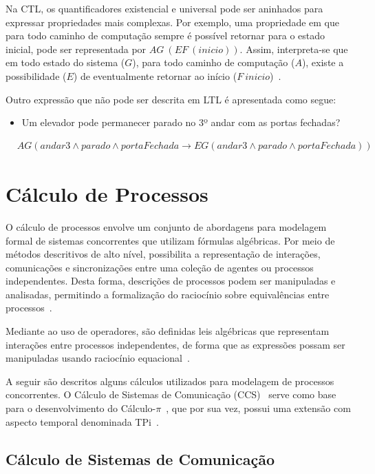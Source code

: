 Na CTL, os quantificadores existencial e universal pode ser aninhados para expressar propriedades mais complexas. Por exemplo, uma propriedade em que para todo caminho de computação sempre é possível retornar para o estado inicial, pode ser representada por $AG~(EF~(inicio))$. Assim, interpreta-se que em todo estado do sistema ($G$), para todo caminho de computação ($A$), existe a possibilidade ($E$) de eventualmente retornar ao início ($F~inicio$)~\cite{baier2008principles}.

Outro expressão que não pode ser descrita em LTL é apresentada como segue:
\begin{itemize}
	\item Um elevador pode permanecer parado no 3º andar com as portas fechadas?
\end{itemize}
\begin{align}
& AG(andar3\wedge parado \wedge portaFechada \rightarrow EG(andar3 \wedge parado \wedge portaFechada))
\end{align} 

\section{Cálculo de Processos}

O cálculo de processos envolve um conjunto de abordagens para modelagem formal de sistemas concorrentes que utilizam fórmulas algébricas. Por meio de métodos descritivos de alto nível, possibilita a representação de interações, comunicações e sincronizações entre uma coleção de agentes ou processos independentes. Desta forma, descrições de processos podem ser manipuladas e analisadas, permitindo a formalização do raciocínio sobre equivalências entre processos~\cite{baeten2005brief}.

Mediante ao uso de operadores, são definidas leis algébricas que representam interações entre processos independentes, de forma que as expressões possam ser manipuladas usando raciocínio equacional~\cite{baeten2005brief}.

A seguir são descritos alguns cálculos utilizados para modelagem de processos concorrentes. O Cálculo de Sistemas de Comunicação (CCS)~\cite{milner1986ccs} serve como base para o desenvolvimento do Cálculo-$\pi$~\cite{milner1992calculus, milner1992calculus2}, que por sua vez, possui uma extensão com aspecto temporal denominada TPi~\cite{berger2003two}.

\subsection{Cálculo de Sistemas de Comunicação}

